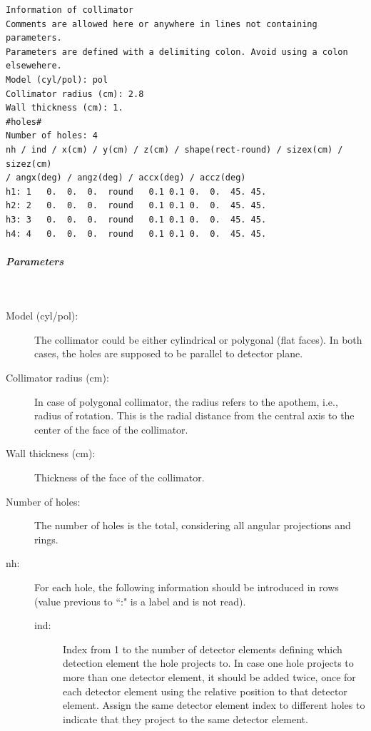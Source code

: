 \documentclass{article}
\newcommand{\subsubsubsubsection}[1]{\subparagraph{#1} \mbox{} \\}
\begin{document}
{{{{{{\begin{verbatim}
Information of collimator
Comments are allowed here or anywhere in lines not containing parameters.
Parameters are defined with a delimiting colon. Avoid using a colon elsewehere.
Model (cyl/pol): pol
Collimator radius (cm): 2.8
Wall thickness (cm): 1.
#holes#
Number of holes: 4
nh / ind / x(cm) / y(cm) / z(cm) / shape(rect-round) / sizex(cm) / sizez(cm)
/ angx(deg) / angz(deg) / accx(deg) / accz(deg)
h1:	1	0.	0.	0.	round	0.1	0.1	0.	0.	45.	45.
h2:	2	0.	0.	0.	round	0.1	0.1	0.	0.	45.	45.
h3:	3	0.	0.	0.	round	0.1	0.1	0.	0.	45.	45.
h4:	4	0.	0.	0.	round	0.1	0.1	0.	0.	45.	45.
\end{verbatim}

{ \subsubsubsubsection{Parameters} }
\begin{description}

\item[Model (cyl/pol):] The collimator could be either cylindrical or polygonal (flat faces). In both cases, the holes are supposed to be parallel to detector plane.

\item[Collimator radius (cm):] In case of polygonal collimator, the radius refers to the apothem, i.e., radius of rotation. This is the radial distance from the central axis to the center of the face of the collimator.

\item[Wall thickness (cm):] Thickness of the face of the collimator.

\item[Number of holes:] The number of holes is the total, considering all angular projections and rings. 

\item[nh:] For each hole, the following information should be introduced in rows (value previous to ``:" is a label and is not read).

\begin{description}

\item[ind:] Index from 1 to the number of detector elements defining which detection element the hole projects to. In case one hole projects to more than one detector element, it should be added twice, once for each detector element using the relative position to that detector element. Assign the same detector element index to different holes to indicate that they project to the same detector element.


\end{description}
\end{description}}}}}}}
\end{document}
